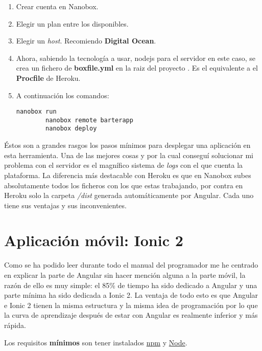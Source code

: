 \begin{enumerate}
	\item Crear cuenta en Nanobox.
	\item Elegir un plan entre los disponibles.
	\item Elegir un \emph{host}. Recomiendo \textbf{Digital Ocean}.
	\item Ahora, sabiendo la tecnología a usar, nodejs para el servidor en este caso, se crea un fichero de  \textbf{boxfile.yml} en la raiz del proyecto\citep{nano2} . Es el equivalente a el \textbf{Procfile} de Heroku.
	\item A continuación los comandos:	

	\lstset{language=C, breaklines=true, basicstyle=\footnotesize}
		\begin{lstlisting}[frame=single] 
		nanobox run
		nanobox remote barterapp
		nanobox deploy
    	\end{lstlisting}	
    	
\end{enumerate}    
	
    	Éstos son a grandes rasgos los pasos mínimos para desplegar una aplicación en esta herramienta. Una de las mejores cosas y por la cual conseguí solucionar mi problema con el servidor es el magnífico sistema de \emph{logs} con el que cuenta la plataforma. La diferencia más destacable con Heroku es que en Nanobox subes absolutamente todos los ficheros con los que estas trabajando, por contra en Heroku solo la carpeta \emph{/dist} generada automáticamente por Angular. Cada uno tiene sus ventajas y sus inconvenientes.
    	

\section{Aplicación móvil: Ionic 2}
Como se ha podido leer durante todo el manual del programador me he centrado en explicar la parte de Angular sin hacer mención alguna a la parte móvil, la razón de ello es muy simple: el 85\% de tiempo ha sido dedicado a Angular y una parte mínima ha sido dedicada a Ionic 2. La ventaja de todo esto es que Angular e Ionic 2 tienen la misma estructura y la misma idea de programación por lo que la curva de aprendizaje después de estar con Angular es realmente inferior y más rápida. 

Los requisitos \textbf{mínimos} son tener instalados \underline{npm} y \underline{Node}.

